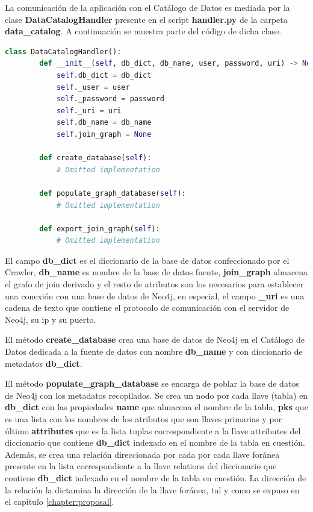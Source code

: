 La comunicación de la aplicación con el Catálogo de Datos es mediada por la clase \textbf{DataCatalogHandler} 
presente en el script \textbf{handler.py} de la carpeta \textbf{data\_catalog}. A continuación se muestra parte 
del código de dicha clase.

\begin{lstlisting}[label={code:catalog}, caption={Clase DataCatalogHandler}, language={python}]
    class DataCatalogHandler():
        def __init__(self, db_dict, db_name, user, password, uri) -> None:
            self.db_dict = db_dict
            self._user = user
            self._password = password
            self._uri = uri
            self.db_name = db_name
            self.join_graph = None

        def create_database(self):
            # Omitted implementation

        def populate_graph_database(self):
            # Omitted implementation

        def export_join_graph(self):
            # Omitted implementation

\end{lstlisting}

El campo \textbf{db\_dict} es el diccionario de la base de datos confeccionado por el Crawler, \textbf{db\_name} es 
nombre de la base de datos fuente, \textbf{join\_graph} almacena el grafo de join derivado y el resto de atributos 
son los necesarios para establecer una conexión con una base de datos de Neo4j, en especial, el campo \textbf{\_uri} 
es una cadena de texto que contiene el protocolo de comunicación con el servidor de Neo4j, su ip y su puerto. 

El método \textbf{create\_database} crea una base de datos de Neo4j en el Catálogo de Datos dedicada a la 
fuente de datos con nombre \textbf{db\_name} y con diccionario de metadatos \textbf{db\_dict}. 

El método \textbf{populate\_graph\_database} se encarga de poblar la base de datos de Neo4j con los metadatos
recopilados. Se crea 
un nodo por cada llave (tabla) 
en \textbf{db\_dict} con las propiedades \textbf{name} que almacena el nombre de la tabla, \textbf{pks} que es una 
lista con los nombres de los atributos que son llaves primarias y por \'ultimo \textbf{attributes} que 
es la lista tuplas correspondiente a la llave attributes del diccionario que contiene \textbf{db\_dict} 
indexado en el nombre de la tabla en cuestión. Además, se crea una relación direccionada por cada por cada llave for\'anea 
presente en la lista correspondiente a la llave relations del diccionario que contiene \textbf{db\_dict} 
indexado en el nombre de la tabla en cuestión. La dirección de la relación la dictamina la dirección de la llave 
for\'anea, tal y como se expuso en el capitulo \ref{chapter:proposal}.


